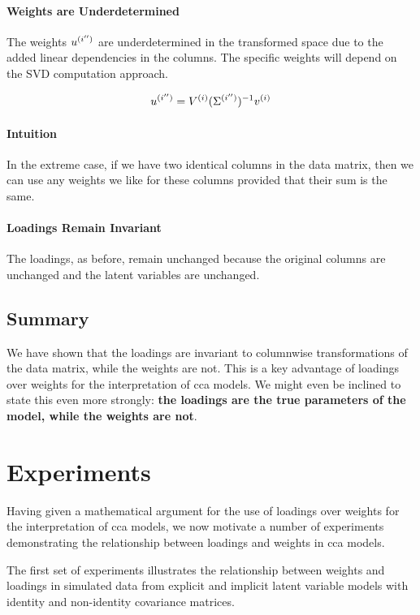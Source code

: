 \paragraph{Weights are Underdetermined}
The weights \( u^{(i'')} \) are underdetermined in the transformed space due to the added linear dependencies in the columns. The specific weights will depend on the SVD computation approach.

\begin{align}
    u^{(i'')} = V^{(i)}(\Sigma^{(i'')})^{-1}v^{(i)} \label{eq:weights_change}
\end{align}

\paragraph{Intuition}
In the extreme case, if we have two identical columns in the data matrix, then we can use any weights we like for these columns provided that their sum is the same.

\paragraph{Loadings Remain Invariant}
The loadings, as before, remain unchanged because the original columns are unchanged and the latent variables are unchanged.

\subsection{Summary}

We have shown that the \gls{loadings} are invariant to columnwise transformations of the data matrix, while the weights are not.
This is a key advantage of \gls{loadings} over weights for the interpretation of \acrshort{cca} models.
We might even be inclined to state this even more strongly: \textbf{the loadings are the true parameters of the model, while the weights are not}.

\section{Experiments}

Having given a mathematical argument for the use of \gls{loadings} over weights for the interpretation of \acrshort{cca} models, we now motivate a number of experiments demonstrating the relationship between loadings and weights in \acrshort{cca} models.

The first set of experiments illustrates the relationship between weights and \gls{loadings} in simulated data from explicit and implicit latent variable models with identity and non-identity covariance matrices.

